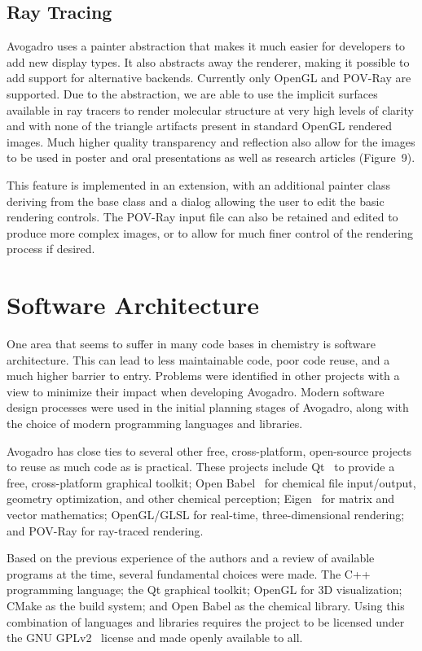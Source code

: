 \documentclass[10pt]{bmc_article}
\newenvironment{bmcformat}{\begin{raggedright}
  \baselineskip20pt\sloppy\setboolean{publ}{false}}{\end{raggedright}
  \baselineskip20pt\sloppy}
\begin{document}
\begin{bmcformat}
\subsection*{Ray Tracing}

Avogadro uses a painter abstraction that makes it much easier for developers to
add new display types. It also abstracts away the renderer, making it possible
to add support for alternative backends. Currently only OpenGL and POV-Ray are
supported. Due to the abstraction, we are able to use the implicit surfaces
available in ray tracers to render molecular structure at very high levels of
clarity and with none of the triangle artifacts present in standard OpenGL rendered
images. Much higher quality transparency and reflection also allow for the
images to be used in poster and oral presentations as well as research
articles (Figure~9).

This feature is implemented in an extension, with an additional painter class
deriving from the base class and a dialog allowing the user to edit the basic
rendering controls. The POV-Ray input file can also be retained and edited to
produce more complex images, or to allow for much finer control of the
rendering process if desired.

\section*{Software Architecture}

One area that seems to suffer in many code bases in chemistry is software
architecture. This can lead to less maintainable code, poor code reuse, and a
much higher barrier to entry. Problems were identified in other projects with a
view to minimize their impact when developing Avogadro. Modern software design
processes were used in the initial planning stages of Avogadro, along with the
choice of modern programming languages and libraries.

Avogadro has close ties to several other free, cross-platform, open-source
projects to reuse as much code as is practical. These projects include
Qt~\cite{Qt} to provide a free, cross-platform graphical toolkit; Open
Babel~\cite{OpenBabel} for chemical file input/output, geometry optimization, and
other chemical perception; Eigen~\cite{Eigen} for matrix and vector mathematics;
OpenGL/GLSL for real-time, three-dimensional rendering; and POV-Ray for ray-traced
rendering.

Based on the previous experience of the authors and a review of
available programs at the time, several fundamental choices were made.
The C++ programming language; the Qt graphical toolkit;
OpenGL for 3D visualization; CMake as the build system; and Open Babel as
the chemical library. Using this combination of languages and
libraries requires the project to be licensed under the GNU GPLv2~\cite{GPLv2}
license and made openly available to all.


\end{bmcformat}
\end{document}
